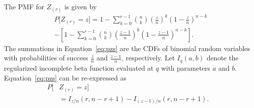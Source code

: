 \documentclass[12pt]{article}
\theoremstyle{plain}
\begin{document}
The PMF for $Z_{(r)}$ is given by
\begin{align}
	&P\bigg[ Z_{(r)} = z \bigg] = 
	1 - \sum_{k = 0}^{r-1} {n \choose k} \left(\frac{z}{n}\right)^k\left(1-\frac{z}{n}\right)^{n-k} \label{eq:pzs}\\
	&-  \left[1 - \sum_{k = 0}^{r-1} {n \choose k} \left(\frac{z - 1}{n}\right)^k\left(1-\frac{z - 1}{n}\right)^{n-k} \right]. \nonumber
\end{align}
	The summations in Equation~\eqref{eq:pzs} are the CDFs of binomial random variables with probabilities of success $\frac{z}{n}$ and $\frac{z-1}{n}$, respectively. Let $I_q(a,b)$ denote the regularized incomplete beta function evaluated at $q$ with parameters $a$ and $b$. Equation~\eqref{eq:pzs} can be re-expressed as
\begin{align}
	P\bigg[ &Z_{(r)} = z \bigg] \label{eq:pzr} \\
	&= I_{z/n}(r, n - r + 1) -  I_{(z-1)/n}(r, n - r + 1).\nonumber 
\end{align}
\end{document}

